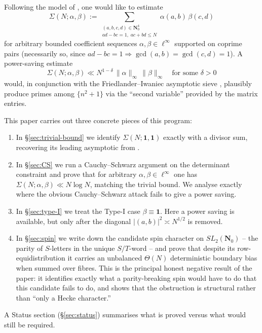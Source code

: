 \documentclass[11pt]{article}
\theoremstyle{definition}
\newcommand{\Nz}{\mathbf{N}_0}
\newcommand{\SLNz}{SL_2(\Nz)}
\begin{document}
Following the model of \cite{FI98a}, one would like to estimate
\begin{equation}\label{eq:master-bilinear-sum}
\Sigma(N;\alpha,\beta)
:=\sum_{\substack{(a,b,c,d)\in\Nz^{4}\\ ad-bc=1,\;ac+bd\le N}}
\alpha(a,b)\,\beta(c,d)
\end{equation}
for arbitrary bounded coefficient sequences $\alpha,\beta\in\ell^{\infty}$
supported on coprime pairs (necessarily so, since
$ad-bc=1\Rightarrow\gcd(a,b)=\gcd(c,d)=1$). A power-saving estimate
\[
\Sigma(N;\alpha,\beta)\ll N^{1-\delta}\,\|\alpha\|_{\infty}\,\|\beta\|_{\infty}
\quad\text{for some }\delta>0
\]
would, in conjunction with the Friedlander--Iwaniec asymptotic sieve
\cite{FI98a}, plausibly produce primes among $\{n^{2}+1\}$ via the
``second variable'' provided by the matrix entries.

This paper carries out three concrete pieces of this program:

\begin{enumerate}
\item In \S\ref{sec:trivial-bound} we identify
$\Sigma(N;\mathbf{1},\mathbf{1})$ exactly with a divisor sum, recovering
its leading asymptotic from \cite{hooley63}.
\item In \S\ref{sec:CS} we run a Cauchy--Schwarz argument on the
determinant constraint and prove that for arbitrary
$\alpha,\beta\in\ell^{\infty}$ one has
$\Sigma(N;\alpha,\beta)\ll N\log N$, matching the trivial bound. We
analyse exactly where the obvious Cauchy--Schwarz attack fails to give a
power saving.
\item In \S\ref{sec:type-I} we treat the Type-I case
$\beta\equiv\mathbf{1}$. Here a power saving is available, but only after
the diagonal $|(a,b)|^{2}\asymp N^{1/2}$ is removed.
\item In \S\ref{sec:spin} we write down the candidate spin character on
$\SLNz$ -- the parity of $S$-letters in the unique $S/T$-word -- and
prove that despite its row-equidistribution it carries an unbalanced
$\Theta(N)$ deterministic boundary bias when summed over fibres. This
is the principal honest negative result of the paper: it identifies
exactly what a parity-breaking spin would have to do that this candidate
fails to do, and shows that the obstruction is structural rather than
``only a Hecke character.''
\end{enumerate}

A Status section (\S\ref{sec:status}) summarises what is proved versus
what would still be required.
\end{document}
